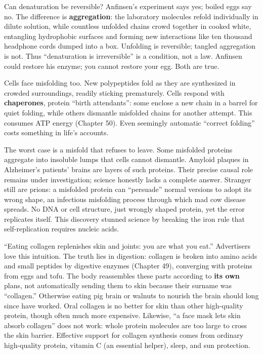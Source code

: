 Can denaturation be reversible? Anfinsen's experiment says yes; boiled eggs say no. The difference is \textbf{aggregation}: the laboratory molecules refold individually in dilute solution, while countless unfolded chains crowd together in cooked white, entangling hydrophobic surfaces and forming new interactions like ten thousand headphone cords dumped into a box. Unfolding is reversible; tangled aggregation is not. Thus ``denaturation is irreversible'' is a condition, not a law. Anfinsen could restore his enzyme; you cannot restore your egg. Both are true.

Cells face misfolding too. New polypeptides fold as they are synthesized in crowded surroundings, readily sticking prematurely. Cells respond with \textbf{chaperones}, protein ``birth attendants'': some enclose a new chain in a barrel for quiet folding, while others dismantle misfolded chains for another attempt. This consumes ATP energy (Chapter 50). Even seemingly automatic ``correct folding'' costs something in life's accounts.

The worst case is a misfold that refuses to leave. Some misfolded proteins aggregate into insoluble lumps that cells cannot dismantle. Amyloid plaques in Alzheimer's patients' brains are layers of such proteins. Their precise causal role remains under investigation; science honestly lacks a complete answer. Stranger still are prions: a misfolded protein can ``persuade'' normal versions to adopt its wrong shape, an infectious misfolding process through which mad cow disease spreads. No DNA or cell structure, just wrongly shaped protein, yet the error replicates itself. This discovery stunned science by breaking the iron rule that self-replication requires nucleic acids.

\begin{wuqu}
``Eating collagen replenishes skin and joints: you are what you eat.'' Advertisers love this intuition. The truth lies in digestion: collagen is broken into amino acids and small peptides by digestive enzymes (Chapter 49), converging with proteins from eggs and tofu. The body reassembles these parts according to \textbf{its own} plans, not automatically sending them to skin because their surname was ``collagen.'' Otherwise eating pig brain or walnuts to nourish the brain should long since have worked. Oral collagen is no better for skin than other high-quality protein, though often much more expensive. Likewise, ``a face mask lets skin absorb collagen'' does not work: whole protein molecules are too large to cross the skin barrier. Effective support for collagen synthesis comes from ordinary high-quality protein, vitamin C (an essential helper), sleep, and sun protection.
\end{wuqu}

